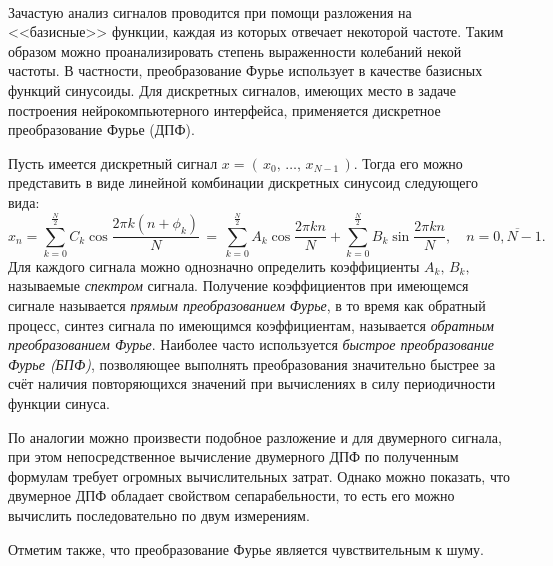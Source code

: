 \documentclass[12pt,a4paper,oneside,fleqn,leqno]{article}
\newcounter{pe} %
\newcommand*{\Nep}{\addtocounter{pe}{1}{\arabic{pe}$^{\circ}$.\;}}
\newcommand*{\NepS}{\mbox{} \\ \Nep}
\begin{document}
	\NepS {\bf Преобразование Фурье}
	\par Зачастую анализ сигналов проводится при помощи разложения на <<базисные>> функции, каждая из которых отвечает некоторой частоте. Таким образом можно проанализировать степень выраженности колебаний некой частоты. В частности, преобразование Фурье использует в качестве базисных функций синусоиды. Для дискретных сигналов, имеющих место в задаче построения нейрокомпьютерного интерфейса, применяется дискретное преобразование Фурье (ДПФ).
	\par Пусть имеется дискретный сигнал $x = (\, x_0, \, \ldots, \, x_{N-1}\, )$. Тогда его можно представить в виде линейной комбинации дискретных синусоид следующего вида:
$$x_n = \sum_{k=0}^{\frac{N}{2}} C_k \cos{\frac{2 \pi k (n + \phi_k)}{N}}\, = \, \sum_{k=0}^{\frac{N}{2}} A_k \cos{\frac{2 \pi k n}{N}} + \sum_{k=0}^{\frac{N}{2}} B_k \sin{\frac{2 \pi k n}{N}}, \quad n = \overline{0, N-1}.$$
	Для каждого сигнала можно однозначно определить коэффициенты $A_k,\, B_k,$ называемые {\it спектром} сигнала. Получение коэффициентов при имеющемся сигнале называется {\it прямым преобразованием Фурье}, в то время как обратный процесс, синтез сигнала по имеющимся коэффициентам, называется {\it обратным преобразованием Фурье}. Наиболее часто используется {\it быстрое преобразование Фурье (БПФ)}, позволяющее выполнять преобразования значительно быстрее за счёт  наличия повторяющихся значений при вычислениях в силу периодичности функции синуса. 
	\par По аналогии можно произвести подобное разложение и для двумерного сигнала, при этом непосредственное вычисление двумерного ДПФ по полученным формулам требует огромных вычислительных затрат. Однако можно показать, что двумерное ДПФ обладает свойством сепарабельности, то есть его можно вычислить последовательно по двум измерениям. 
	\par Отметим также, что преобразование Фурье является чувствительным к шуму.
\end{document}
